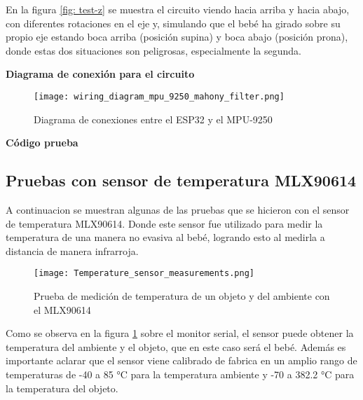         En la figura \ref{fig: test-z} se muestra el circuito viendo hacia arriba y hacia abajo, con diferentes rotaciones en el eje y,
        simulando que el bebé ha girado sobre su propio eje estando boca arriba (posición supina) y boca abajo (posición prona), donde estas
        dos situaciones son peligrosas, especialmente la segunda.\newline

        \textbf{Diagrama de conexión para el circuito}
        \begin{figure}[htp!]
            \centering
                \texttt{[image: wiring\_diagram\_mpu\_9250\_mahony\_filter.png]}
                \caption{Diagrama de conexiones entre el ESP32 y el MPU-9250}
            \end{figure}
            \FloatBarrier 
        \textbf{Código prueba}

        \lstset{style=mystyle}

        

        \subsection{Pruebas con sensor de temperatura MLX90614}

        A continuacion se muestran algunas de las pruebas que se hicieron con el sensor de temperatura MLX90614.
        Donde este sensor fue utilizado para medir la temperatura de una manera no evasiva al bebé, logrando esto 
        al medirla a distancia de manera infrarroja. 

        \begin{figure}[htp!]
            \centering
                 \texttt{[image: Temperature\_sensor\_measurements.png]}
                  \caption{Prueba de medición de temperatura de un objeto y del ambiente con el MLX90614}
                  \label{fig: temperature_measurements}
        \end{figure}
        \FloatBarrier 

        Como se observa en la figura \ref{fig: temperature_measurements} sobre el monitor serial, el sensor puede obtener la temperatura del 
        ambiente y el objeto, que en este caso será el bebé. Además es importante aclarar que el sensor viene calibrado de fabrica en un amplio rango de temperaturas de 
        -40 a 85 °C para la temperatura ambiente y -70 a 382.2 °C para la temperatura del objeto.\newline

